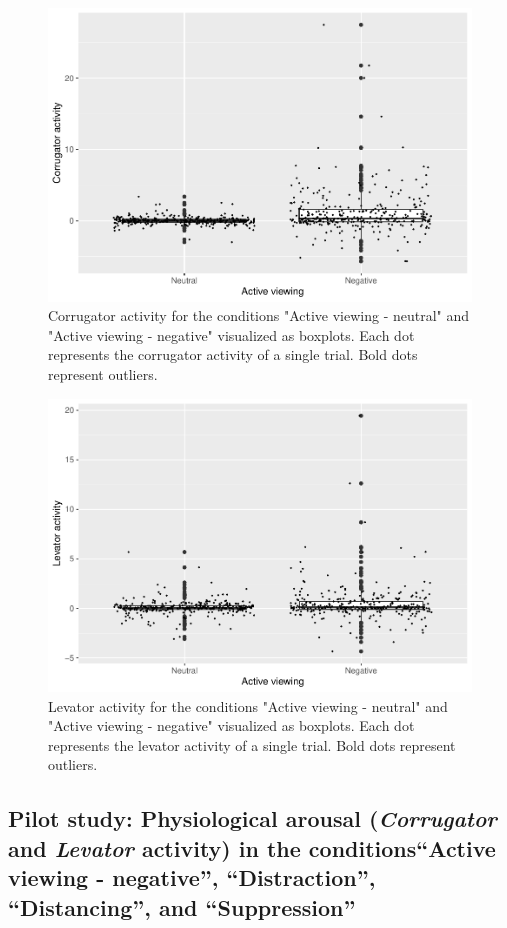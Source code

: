 \documentclass[
  english,
  man,floatsintext]{apa6}
\begin{document}
\begin{figure}[H]
\includegraphics[width=0.75\linewidth]{Manuscript_ERED_Stage1_files/figure-latex/FigEMGCorrViewPilot-1} \caption{Corrugator activity for the conditions "Active viewing - neutral" and "Active viewing - negative" visualized as boxplots. Each dot represents the corrugator activity of a single trial. Bold dots represent outliers.}\label{fig:FigEMGCorrViewPilot}
\end{figure}
\begin{figure}[H]
\includegraphics[width=0.75\linewidth]{Manuscript_ERED_Stage1_files/figure-latex/FigEMGLevViewPilot-1} \caption{Levator activity for the conditions "Active viewing - neutral" and "Active viewing - negative" visualized as boxplots. Each dot represents the levator activity of a single trial. Bold dots represent outliers.}\label{fig:FigEMGLevViewPilot}
\end{figure}

\hypertarget{pilot-study-physiological-arousal-corrugator-and-levator-activity-in-the-conditionsactive-viewing---negative-distraction-distancing-and-suppression}{%
\subsection{\texorpdfstring{Pilot study: Physiological arousal (\emph{Corrugator} and \emph{Levator} activity) in the conditions``Active viewing - negative'', ``Distraction'', ``Distancing'', and ``Suppression''}{Pilot study: Physiological arousal (Corrugator and Levator activity) in the conditions``Active viewing - negative'', ``Distraction'', ``Distancing'', and ``Suppression''}}\label{pilot-study-physiological-arousal-corrugator-and-levator-activity-in-the-conditionsactive-viewing---negative-distraction-distancing-and-suppression}}
\end{document}
